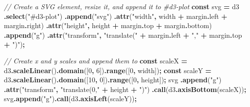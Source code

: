 \documentclass[
]{book}
\newenvironment{Shaded}{\begin{snugshade}}{\end{snugshade}}
\newcommand{\AttributeTok}[1]{\textcolor[rgb]{0.13,0.29,0.53}{#1}}
\newcommand{\CommentTok}[1]{\textcolor[rgb]{0.56,0.35,0.01}{\textit{#1}}}
\newcommand{\DecValTok}[1]{\textcolor[rgb]{0.00,0.00,0.81}{#1}}
\newcommand{\FunctionTok}[1]{\textcolor[rgb]{0.13,0.29,0.53}{\textbf{#1}}}
\newcommand{\KeywordTok}[1]{\textcolor[rgb]{0.13,0.29,0.53}{\textbf{#1}}}
\newcommand{\NormalTok}[1]{#1}
\newcommand{\OperatorTok}[1]{\textcolor[rgb]{0.81,0.36,0.00}{\textbf{#1}}}
\newcommand{\StringTok}[1]{\textcolor[rgb]{0.31,0.60,0.02}{#1}}
\theoremstyle{definition}
\theoremstyle{definition}
\theoremstyle{definition}
\theoremstyle{definition}
\theoremstyle{remark}
\begin{document}
\begin{Shaded}
\begin{Highlighting}[]
\CommentTok{// Create a SVG element, resize it, and append it to \#d3{-}plot}
\KeywordTok{const}\NormalTok{ svg }\OperatorTok{=}\NormalTok{ d3}
  \OperatorTok{.}\FunctionTok{select}\NormalTok{(}\StringTok{"\#d3{-}plot"}\NormalTok{)}
  \OperatorTok{.}\FunctionTok{append}\NormalTok{(}\StringTok{"svg"}\NormalTok{)}
  \OperatorTok{.}\FunctionTok{attr}\NormalTok{(}\StringTok{"width"}\OperatorTok{,}\NormalTok{ width }\OperatorTok{+}\NormalTok{ margin}\OperatorTok{.}\AttributeTok{left} \OperatorTok{+}\NormalTok{ margin}\OperatorTok{.}\AttributeTok{right}\NormalTok{)}
  \OperatorTok{.}\FunctionTok{attr}\NormalTok{(}\StringTok{"height"}\OperatorTok{,}\NormalTok{ height }\OperatorTok{+}\NormalTok{ margin}\OperatorTok{.}\AttributeTok{top} \OperatorTok{+}\NormalTok{ margin}\OperatorTok{.}\AttributeTok{bottom}\NormalTok{)}
  \OperatorTok{.}\FunctionTok{append}\NormalTok{(}\StringTok{"g"}\NormalTok{)}
  \OperatorTok{.}\FunctionTok{attr}\NormalTok{(}\StringTok{"transform"}\OperatorTok{,} \StringTok{"translate("} \OperatorTok{+}\NormalTok{ margin}\OperatorTok{.}\AttributeTok{left} \OperatorTok{+} \StringTok{","} \OperatorTok{+}\NormalTok{ margin}\OperatorTok{.}\AttributeTok{top} \OperatorTok{+} \StringTok{")"}\NormalTok{)}\OperatorTok{;}

\CommentTok{// Create x and y scales and append them to}
\KeywordTok{const}\NormalTok{ scaleX }\OperatorTok{=}\NormalTok{ d3}\OperatorTok{.}\FunctionTok{scaleLinear}\NormalTok{()}\OperatorTok{.}\FunctionTok{domain}\NormalTok{([}\DecValTok{0}\OperatorTok{,} \DecValTok{6}\NormalTok{])}\OperatorTok{.}\FunctionTok{range}\NormalTok{([}\DecValTok{0}\OperatorTok{,}\NormalTok{ width])}\OperatorTok{;}
\KeywordTok{const}\NormalTok{ scaleY }\OperatorTok{=}\NormalTok{ d3}\OperatorTok{.}\FunctionTok{scaleLinear}\NormalTok{()}\OperatorTok{.}\FunctionTok{domain}\NormalTok{([}\DecValTok{10}\OperatorTok{,} \DecValTok{0}\NormalTok{])}\OperatorTok{.}\FunctionTok{range}\NormalTok{([}\DecValTok{0}\OperatorTok{,}\NormalTok{ height])}\OperatorTok{;}
\NormalTok{svg}
  \OperatorTok{.}\FunctionTok{append}\NormalTok{(}\StringTok{"g"}\NormalTok{)}
  \OperatorTok{.}\FunctionTok{attr}\NormalTok{(}\StringTok{"transform"}\OperatorTok{,} \StringTok{"translate(0,"} \OperatorTok{+}\NormalTok{ height }\OperatorTok{+} \StringTok{")"}\NormalTok{)}
  \OperatorTok{.}\FunctionTok{call}\NormalTok{(d3}\OperatorTok{.}\FunctionTok{axisBottom}\NormalTok{(scaleX))}\OperatorTok{;}
\NormalTok{svg}\OperatorTok{.}\FunctionTok{append}\NormalTok{(}\StringTok{"g"}\NormalTok{)}\OperatorTok{.}\FunctionTok{call}\NormalTok{(d3}\OperatorTok{.}\FunctionTok{axisLeft}\NormalTok{(scaleY))}\OperatorTok{;}


\end{Highlighting}
\end{Shaded}
\end{document}
